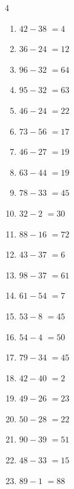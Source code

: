 \begin{multicols}{4}
\begin{enumerate}
  \item $42-38$
        $=4$

  \item $36-24$
        $=12$

\columnbreak %

  \item $96-32$
        $=64$

  \item $95-32$
        $=63$

  \item $46-24$
        $=22$

  \item $73-56$
        $=17$

  \item $46-27$
        $=19$

  \item $63-44$
        $=19$

  \item $78-33$
        $=45$

  \item $32-2$
        $=30$

  \item $88-16$
        $=72$

  \item $43-37$
        $=6$

  \item $98-37$
        $=61$

  \item $61-54$
        $=7$

  \item $53-8$
        $=45$

  \item $54-4$
        $=50$

  \item $79-34$
        $=45$

  \item $42-40$
        $=2$

  \item $49-26$
        $=23$

  \item $50-28$
        $=22$

  \item $90-39$
        $=51$

  \item $48-33$
        $=15$

  \item $89-1$
        $=88$


\end{enumerate}
\end{multicols}
